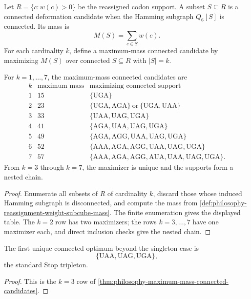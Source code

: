\begin{definition}
\label{def:philosophy-connected-deformation-candidate}
Let $R=\{c:w(c)>0\}$ be the reassigned codon support. A subset
$S\subseteq R$ is a connected deformation candidate when the Hamming
subgraph $Q_{6}[S]$ is connected. Its mass is
$$
  M(S)=\sum_{c\in S}w(c).
$$
For each cardinality $k$, define a maximum-mass connected candidate by
maximizing $M(S)$ over connected $S\subseteq R$ with $|S|=k$.
\end{definition}

\begin{theorem}
\label{thm:philosophy-maximum-mass-connected-candidates}
For $k=1,\ldots,7$, the maximum-mass connected candidates are
$$
\begin{array}{c|r|l}
  k & \text{maximum mass} & \text{maximizing connected support}\\
\hline
  1 & 15 & \{\mathrm{UGA}\}\\
  2 & 23 & \{\mathrm{UGA},\mathrm{AGA}\}\ \text{or}\ \{\mathrm{UGA},\mathrm{UAA}\}\\
  3 & 33 & \{\mathrm{UAA},\mathrm{UAG},\mathrm{UGA}\}\\
  4 & 41 & \{\mathrm{AGA},\mathrm{UAA},\mathrm{UAG},\mathrm{UGA}\}\\
  5 & 49 & \{\mathrm{AGA},\mathrm{AGG},\mathrm{UAA},\mathrm{UAG},\mathrm{UGA}\}\\
  6 & 52 & \{\mathrm{AAA},\mathrm{AGA},\mathrm{AGG},\mathrm{UAA},\mathrm{UAG},\mathrm{UGA}\}\\
  7 & 57 & \{\mathrm{AAA},\mathrm{AGA},\mathrm{AGG},\mathrm{AUA},
              \mathrm{UAA},\mathrm{UAG},\mathrm{UGA}\}.
\end{array}
$$
From $k=3$ through $k=7$, the maximizer is unique and the supports form
a nested chain.
\end{theorem}
\begin{proof}
Enumerate all subsets of $R$ of cardinality $k$, discard those whose
induced Hamming subgraph is disconnected, and compute the mass from
\autoref{def:philosophy-reassignment-weight-subcube-mass}. The finite
enumeration gives the displayed table. The $k=2$ row has two maximizers;
the rows $k=3,\ldots,7$ have one maximizer each, and direct inclusion
checks give the nested chain.
\end{proof}

\begin{corollary}
\label{cor:philosophy-stop-triplet-first-stable-connected-core}
The first unique connected optimum beyond the singleton case is
$$
  \{\mathrm{UAA},\mathrm{UAG},\mathrm{UGA}\},
$$
the standard Stop tripleton.
\end{corollary}
\begin{proof}
This is the $k=3$ row of
\autoref{thm:philosophy-maximum-mass-connected-candidates}.
\end{proof}

